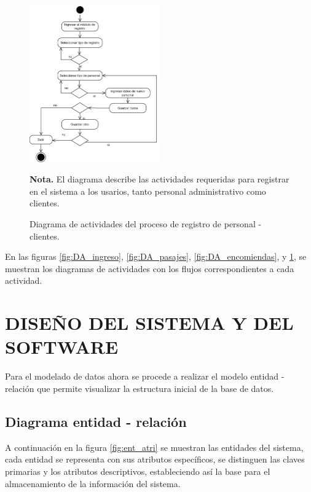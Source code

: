 	\begin{figure}[!h] %
		\caption[Diagrama de actividades - Registro de personal]
		{\newline Diagrama de actividades del proceso de registro de personal - clientes.} %
		\centering
		\includegraphics[width=0.5\textwidth]{imagenes/cap_3/registro.drawio.png} %
		
		\begin{flushleft}
			\begin{doublespace}
			\hspace{1.20cm} \textbf{Nota.} El diagrama describe las actividades requeridas para registrar en el sistema a los usarios, tanto personal administrativo como clientes. %
			\end{doublespace}
		\end{flushleft}
		\vspace{-40pt} %
		\label{fig:DA_registro} %
	\end{figure}
	
	En las figuras \ref{fig:DA_ingreso}, \ref{fig:DA_pasajes}, \ref{fig:DA_encomiendas}, y \ref{fig:DA_registro}, se muestran los diagramas de actividades con los flujos correspondientes a cada actividad.

\section{DISEÑO DEL SISTEMA Y DEL SOFTWARE}
	Para el modelado de datos ahora se procede a realizar el modelo entidad - relación que permite visualizar la estructura inicial de la base de datos.
	\subsection{Diagrama entidad - relación}
	A continuación en la figura \ref{fig:ent_atri} se muestran las entidades del sistema, cada entidad se representa con sus atributos específicos, se distinguen las claves primarias y los atributos descriptivos, estableciendo así la base para el almacenamiento de la información del sistema.
	
